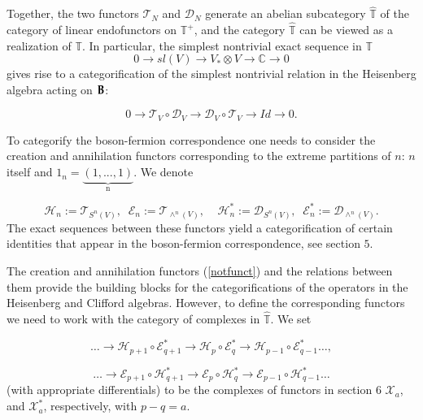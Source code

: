 \documentclass[11pt]{amsart}
\newcommand{\TT}{\mathbb{T}}
\newcommand {\Eps} {\mathcal {E}}
\begin{document}
Together, the two functors $\mathcal{T}_N$ and $\mathcal{D}_N$  generate an abelian subcategory $\widehat{\mathbb{T}}$ of the category
of linear endofunctors on $\TT^+$, and the category $\widehat{\mathbb{T}}$ can be viewed as a realization of $\mathbb T$. 
In particular, the simplest nontrivial exact sequence in ${\mathbb{T}}$
\begin{equation}\label{Halgebra1}
 0 \rightarrow sl(V)\rightarrow V_*\otimes V \rightarrow \mathbb C \rightarrow 0\nonumber
\end{equation}
gives rise to a categorification of the simplest nontrivial  
relation in the Heisenberg algebra acting on $\bold{B}$:

\begin{equation}\label{Halgebra}
 0 \rightarrow \mathcal{T}_V \circ \mathcal{D}_V \rightarrow \mathcal{D}_V \circ \mathcal{T}_V \rightarrow Id \rightarrow 0.
\end{equation}

To categorify the boson-fermion correspondence one needs to consider the creation and annihilation functors corresponding 
to the extreme partitions of $n$: $n$ itself and $1_n = \underbrace{(1,...,1)}_{\text{n}}$. We denote

\begin{equation}\label{notfunct}
 \mathcal{H}_n:=\mathcal{T}_{S^n(V)},\;\; \Eps_n:=\mathcal{T}_{\wedge^{n}(V)},\;\;\;\; \mathcal{H}^*_n:=\mathcal{D}_{S^n(V)},\;\; \Eps^*_n:=\mathcal{D}_{\wedge^n(V)}.
\end{equation}
The exact sequences between these functors yield a categorification of certain identities that appear in the boson-fermion
correspondence, see section $5$.

The creation and annihilation functors (\ref{notfunct}) and the relations between them provide the building blocks for the
categorifications of the operators in the Heisenberg and Clifford algebras. However, to define the corresponding  functors
we need to work with the category of complexes in $\widehat{\mathbb{T}}$. We set 

\begin{equation}\label{note1}
\dots \rightarrow \mathcal{H}_{p+1} \circ \Eps_{q+1}^* \rightarrow \mathcal{H}_{p} \circ \Eps_{q}^* \rightarrow \mathcal{H}_{p-1} \circ \Eps_{q-1}^* \dots, \nonumber
\end{equation}

\begin{equation}\label{note2}
 \dots\rightarrow \Eps_{p+1} \circ \mathcal{H}_{q+1}^* \rightarrow \Eps_{p} \circ \mathcal{H}_{q}^*  \rightarrow \Eps_{p-1} \circ \mathcal{H}_{q-1}^* \dots \nonumber 
\end{equation}
(with appropriate differentials) to be the complexes of functors in section $6$ $\mathcal{X}_a$, and $\mathcal{X}_a^*$, 
respectively, with $p-q=a$.
\end{document}
